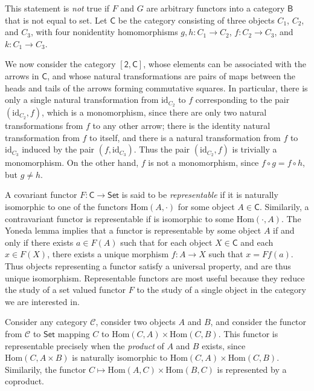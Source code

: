 \begin{remark}
    This statement is \emph{not} true if $F$ and $G$ are arbitrary functors into a category $\mathsf{B}$ that is not equal to set. Let $\mathsf{C}$ be the category consisting of three objects $C_1$, $C_2$, and $C_3$, with four nonidentity homomorphisms $g,h: C_1 \to C_2$, $f: C_2 \to C_3$, and $k: C_1 \to C_3$. 
    \begin{center}
    \end{center}
    We now consider the category $[\mathsf{2}, \mathsf{C}]$, whose elements can be associated with the arrows in $\mathsf{C}$, and whose natural transformations are pairs of maps between the heads and tails of the arrows forming commutative squares. In particular, there is only a single natural transformation from $\text{id}_{C_2}$ to $f$ corresponding to the pair $(\text{id}_{C_2}, f)$, which is a monomorphism, since there are only two natural transformations from $f$ to any other arrow; there is the identity natural transformation from $f$ to itself, and there is a natural transformation from $f$ to $\text{id}_{C_3}$ induced by the pair $(f,\text{id}_{C_3})$. Thus the pair $(\text{id}_{C_2},f)$ is trivially a monomorphism. On the other hand, $f$ is not a monomorphism, since $f \circ g = f \circ h$, but $g \neq h$.
\end{remark}

A covariant functor $F: \mathsf{C} \to \mathsf{Set}$ is said to be \emph{representable} if it is naturally isomorphic to one of the functors $\text{Hom}(A,\cdot)$ for some object $A \in \mathsf{C}$. Similarily, a contravariant functor is representable if is isomorphic to some $\text{Hom}(\cdot,A)$. The Yoneda lemma implies that a functor is representable by some object $A$ if and only if there exists $a \in F(A)$ such that for each object $X \in \mathsf{C}$ and each $x \in F(X)$, there exists a unique morphism $f: A \to X$ such that $x = Ff(a)$. Thus objects representing a functor satisfy a universal property, and are thus unique isomorphism. Representable functors are most useful because they reduce the study of a set valued functor $F$ to the study of a single object in the category we are interested in.

\begin{example}
    Consider any category $\mathcal{C}$, consider two objects $A$ and $B$, and consider the functor from $\mathcal{C}$ to $\mathsf{Set}$ mapping $C$ to $\text{Hom}(C,A) \times \text{Hom}(C,B)$. This functor is representable precisely when the \emph{product} of $A$ and $B$ exists, since $\text{Hom}(C,A \times B)$ is naturally isomorphic to $\text{Hom}(C,A) \times \text{Hom}(C,B)$. Similarily, the functor $C \mapsto \text{Hom}(A,C) \times \text{Hom}(B,C)$ is represented by a coproduct.
\end{example}

